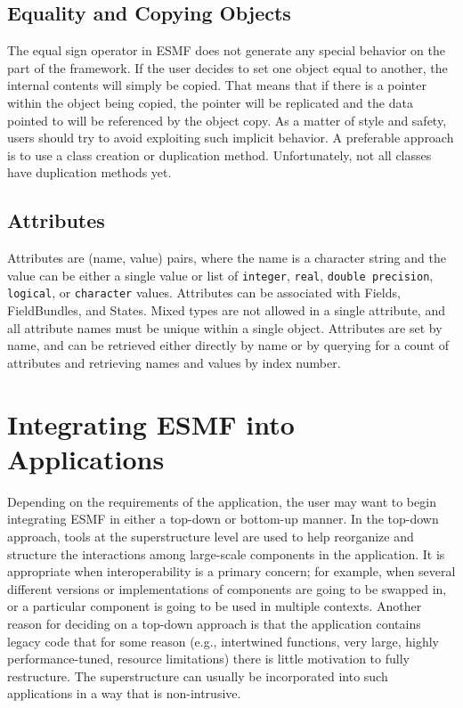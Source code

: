 \subsection{Equality and Copying Objects}

The equal sign operator in ESMF does not generate any special 
behavior on the part of the framework.  If the user decides to set
one object equal to another, the internal contents will simply be
copied.  That means that if there is a pointer within the object
being copied, the pointer will be replicated and the data pointed to 
will be referenced by the object copy.  As a matter of style and 
safety, users should try to avoid exploiting such implicit behavior.
A preferable approach is to use a class creation or duplication 
method.  Unfortunately, not all classes have duplication methods yet.

\subsection{Attributes}

Attributes are (name, value) pairs, where
the name is a character string and the value can be either a single
value or list of {\tt integer}, {\tt real}, {\tt double precision},
{\tt logical}, or {\tt character} values.
Attributes can be associated with Fields, FieldBundles, and States. 
Mixed types are not allowed in a single attribute, and all attribute
names must be unique within a single object.    Attributes are set
by name, and can be retrieved either directly by name or by querying
for a count of attributes and retrieving names and values
by index number.

\section{Integrating ESMF into Applications}

Depending on the requirements of the application, the user may 
want to begin integrating ESMF in either a top-down or bottom-up 
manner.  In the top-down approach, tools at the superstructure 
level are used to help reorganize and structure the interactions
among large-scale components in the application.  It is appropriate
when interoperability is a primary concern; for example, when 
several different versions or implementations of components are going 
to be swapped in, or a particular component is going to be used 
in multiple contexts.  Another reason for deciding on a top-down 
approach is that the application contains legacy code that for 
some reason (e.g., intertwined functions, very large,
highly performance-tuned, resource limitations) there is little 
motivation to fully restructure.  The superstructure can usually be 
incorporated into such applications in a way that is non-intrusive.

